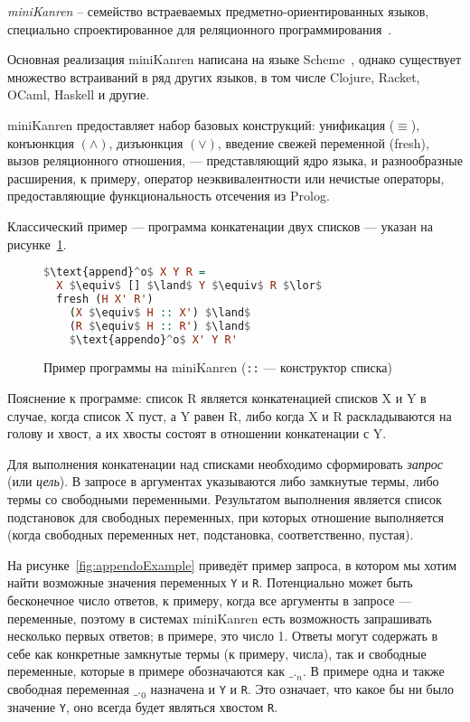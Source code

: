 {\it miniKanren} -- семейство встраеваемых предметно-ориентированных языков, специально спроектированное для
реляционного программирования~\cite{byrdMK}.

Основная реализация miniKanren написана на языке Scheme~\cite{reasonedSchemer}, однако существует множество встраиваний
в ряд других языков, в том числе Clojure, Racket, OCaml, Haskell и другие.

miniKanren предоставляет набор базовых конструкций: унификация ($\equiv$),
конъюнкция $(\land)$, дизъюнкция $(\lor)$, введение свежей переменной (fresh), вызов реляционного отношения,
--- представляющий ядро языка, и разнообразные расширения, к примеру, оператор неэквивалентности
 или нечистые операторы, предоставляющие функциональность
отсечения из Prolog.

Классический пример --- программа конкатенации двух списков --- указан на рисунке~\ref{fig:appendo}.

\begin{figure}[h!]
\begin{lstlisting}[mathescape,language=Haskell,extendedchars=\true,frame=single,basicstyle=\ttfamily]
$\text{append}^o$ X Y R =
  X $\equiv$ [] $\land$ Y $\equiv$ R $\lor$
  fresh (H X' R')
    (X $\equiv$ H :: X') $\land$
    (R $\equiv$ H :: R') $\land$
    $\text{appendo}^o$ X' Y R'
\end{lstlisting}

\caption{Пример программы на miniKanren (\lstinline{::} --- конструктор списка)}
\label{fig:appendo}
\end{figure}

Пояснение к программе:
список R является конкатенацией списков X и Y в случае, когда список X пуст, а Y равен R, либо
когда X и R раскладываются на голову и хвост, а их хвосты состоят в отношении конкатенации с Y.

Для выполнения конкатенации над списками необходимо сформировать \emph{запрос} (или \emph{цель}).
В запросе в аргументах указываются либо замкнутые термы, либо термы со свободными переменными. Результатом
выполнения является список подстановок для свободных переменных, при которых отношение выполняется
(когда свободных переменных нет, подстановка, соответственно, пустая).

На рисунке~\ref{fig:appendoExample} приведёт пример запроса, в котором мы хотим найти возможные значения
переменных \lstinline{Y} и \lstinline{R}. Потенциально может быть бесконечное число ответов, к примеру,
когда все аргументы в запросе --- переменные, поэтому в системах miniKanren есть возможность
запрашивать несколько первых ответов; в примере, это число 1. Ответы могут содержать в себе как
конкретные замкнутые термы (к примеру, числа), так и свободные переменные, которые
в примере обозначаются как $\text{\_.}_n$. В примере одна и также свободная переменная $\text{\_.}_0$
назначена и \lstinline{Y} и \lstinline{R}. Это означает, что какое бы ни было значение \lstinline{Y}, оно всегда
будет являться хвостом \lstinline{R}.

